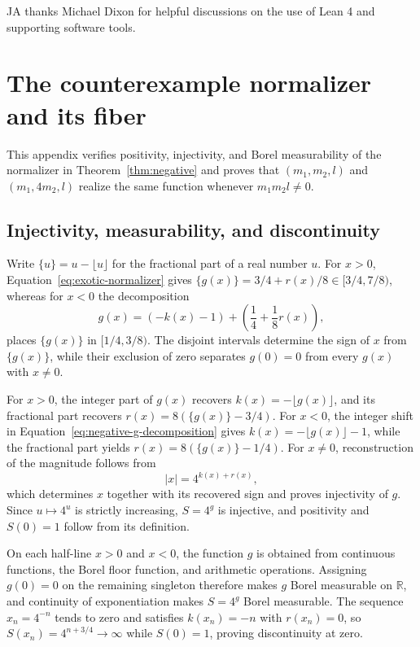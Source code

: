 \documentclass[mlmain]{jmlr}
\newcommand{\R}{\mathbb{R}}
\begin{document}
JA thanks Michael Dixon for helpful discussions on the use of Lean 4 and supporting software tools.



\clearpage
\appendix

\section{The counterexample normalizer and its fiber}
\label{app:counterexample}

This appendix verifies positivity, injectivity, and Borel measurability of
the normalizer in Theorem~\ref{thm:negative} and proves that
$(m_1,m_2,l)$ and $(m_1,4m_2,l)$ realize the same function whenever
$m_1m_2l\ne0$.

\subsection{Injectivity, measurability, and discontinuity}

Write $\{u\}=u-\lfloor u\rfloor$ for the fractional part of a real number
$u$.  For $x>0$, Equation~\eqref{eq:exotic-normalizer} gives
$\{g(x)\}=3/4+r(x)/8\in[3/4,7/8)$, whereas for $x<0$ the decomposition
\begin{equation}
 g(x)=(-k(x)-1)+\left(\frac14+\frac18r(x)\right),
 \label{eq:negative-g-decomposition}
\end{equation}
places $\{g(x)\}$ in $[1/4,3/8)$.  The disjoint intervals determine the
sign of $x$ from $\{g(x)\}$, while their exclusion of zero separates
$g(0)=0$ from every $g(x)$ with $x\ne0$.

For $x>0$, the integer part of $g(x)$ recovers
$k(x)=-\lfloor g(x)\rfloor$, and its fractional part recovers
$r(x)=8(\{g(x)\}-3/4)$.  For $x<0$, the integer shift in
Equation~\eqref{eq:negative-g-decomposition} gives
$k(x)=-\lfloor g(x)\rfloor-1$, while the fractional part yields
$r(x)=8(\{g(x)\}-1/4)$.  For $x\ne0$, reconstruction of the magnitude follows from
\begin{equation}
 |x|=4^{k(x)+r(x)},
 \label{eq:g-decoding}
\end{equation}
which determines $x$ together with its recovered sign and proves
injectivity of $g$.  Since $u\mapsto4^u$ is strictly increasing, $S=4^g$
is injective, and positivity and $S(0)=1$ follow from its definition.

On each half-line $x>0$ and $x<0$, the function $g$ is obtained from
continuous functions, the Borel floor function, and arithmetic operations.
Assigning $g(0)=0$ on the remaining singleton therefore makes $g$ Borel
measurable on $\R$, and continuity of exponentiation makes $S=4^g$ Borel
measurable.  The sequence $x_n=4^{-n}$ tends to zero and satisfies
$k(x_n)=-n$ with $r(x_n)=0$, so $S(x_n)=4^{n+3/4}\to\infty$ while
$S(0)=1$, proving discontinuity at zero.
\end{document}
